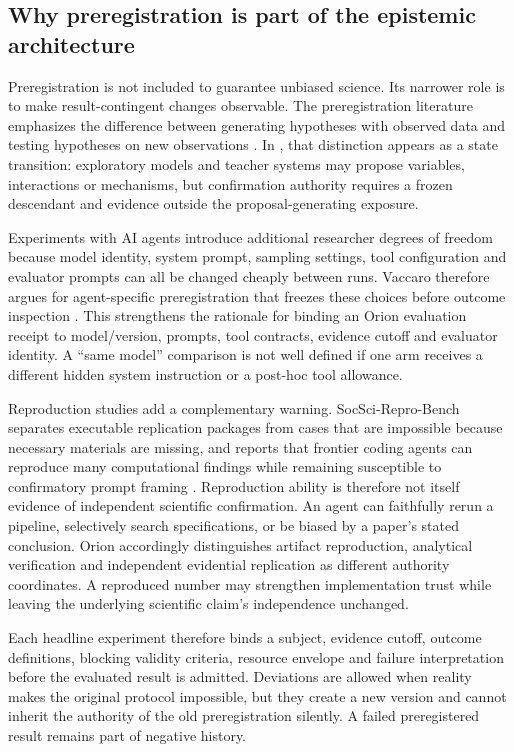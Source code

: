 \subsection{Why preregistration is part of the epistemic architecture}

Preregistration is not included to guarantee unbiased science. Its narrower role is to make result-contingent changes observable. The preregistration literature emphasizes the difference between generating hypotheses with observed data and testing hypotheses on new observations \cite{nosek2018}. In \RAKL{}, that distinction appears as a state transition: exploratory models and teacher systems may propose variables, interactions or mechanisms, but confirmation authority requires a frozen descendant and evidence outside the proposal-generating exposure.

Experiments with AI agents introduce additional researcher degrees of freedom because model identity, system prompt, sampling settings, tool configuration and evaluator prompts can all be changed cheaply between runs. Vaccaro therefore argues for agent-specific preregistration that freezes these choices before outcome inspection \cite{vaccaro2026preregagents}. This strengthens the rationale for binding an Orion evaluation receipt to model/version, prompts, tool contracts, evidence cutoff and evaluator identity. A ``same model'' comparison is not well defined if one arm receives a different hidden system instruction or a post-hoc tool allowance.

Reproduction studies add a complementary warning. SocSci-Repro-Bench separates executable replication packages from cases that are impossible because necessary materials are missing, and reports that frontier coding agents can reproduce many computational findings while remaining susceptible to confirmatory prompt framing \cite{alizadeh2026socsci}. Reproduction ability is therefore not itself evidence of independent scientific confirmation. An agent can faithfully rerun a pipeline, selectively search specifications, or be biased by a paper's stated conclusion. Orion accordingly distinguishes artifact reproduction, analytical verification and independent evidential replication as different authority coordinates. A reproduced number may strengthen implementation trust while leaving the underlying scientific claim's independence unchanged.

Each headline experiment therefore binds a subject, evidence cutoff, outcome definitions, blocking validity criteria, resource envelope and failure interpretation before the evaluated result is admitted. Deviations are allowed when reality makes the original protocol impossible, but they create a new version and cannot inherit the authority of the old preregistration silently. A failed preregistered result remains part of negative history.

